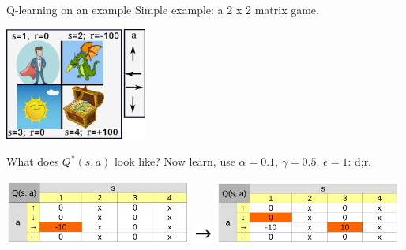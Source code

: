 \documentclass{beamer}
\begin{document}
\begin{frame}{Q-learning on an example}
    Simple example: a 2 x 2 matrix game.

    \begin{center}
      \includegraphics[width=0.35\textwidth]{./Figures/ANNs_reinforcement_learning/Q_learning_example}
    \end{center}

    What does $Q^{*}(s, a)$ look like? Now learn, use $\alpha = 0.1$, $\gamma = 0.5$, $\epsilon = 1$: d;r.

    \begin{center}
      \includegraphics[width=0.46\textwidth]{./Figures/ANNs_reinforcement_learning/Q_learning_example_1}
      \includegraphics[width=0.05\textwidth]{./Figures/ANNs_reinforcement_learning/arrow_right}
      \includegraphics[width=0.46\textwidth]{./Figures/ANNs_reinforcement_learning/Q_learning_example_2}
    \end{center}
\end{frame}
\end{document}
